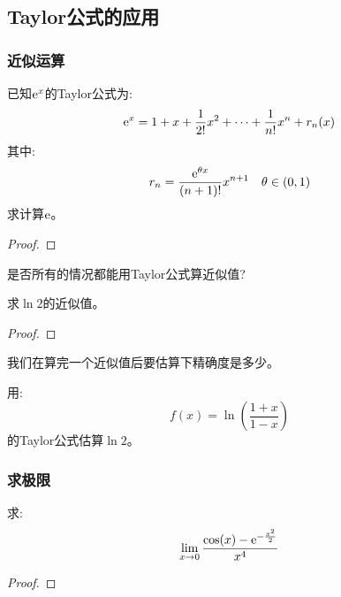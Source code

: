 \subsection{Taylor公式的应用}
\subsubsection{近似运算}
\begin{example}
    已知$\mathrm{e}^x$的Taylor公式为:
    \begin{equation*}
        \mathrm{e}^x = 1 + x + \frac{1}{2!}x^2 + \cdots + \frac{1}{n!}x^n + r_n(x)
    \end{equation*}
    其中:
    \begin{equation*}
        r_n = \frac{\mathrm{e}^{\theta x}}{(n+1)!}x^{n+1} \quad \theta \in (0, 1)
    \end{equation*}
    求计算$\mathrm{e}$。
\end{example}
\begin{proof}
    
\end{proof}
是否所有的情况都能用Taylor公式算近似值?
\begin{example}
    求$\ln2$的近似值。
\end{example}
\begin{proof}
    
\end{proof}
\begin{remark}
    我们在算完一个近似值后要估算下精确度是多少。
\end{remark}

\begin{example}
    用:
    \begin{equation*}
        f(x) = \ln\left(\frac{1+x}{1-x}\right)
    \end{equation*}
    的Taylor公式估算$\ln2$。
\end{example}

\subsubsection{求极限}
\begin{example}
    求:
    \begin{equation*}
        \lim_{x \to 0 } \frac{\cos(x) - \mathrm{e}^{-\frac{x^2}{2}}}{x^4}
    \end{equation*}    
\end{example}
\begin{proof}
    
\end{proof}


